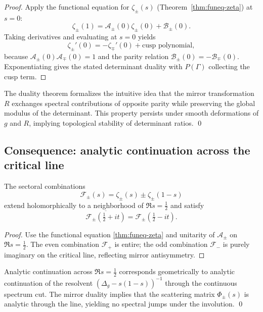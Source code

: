 \begin{proof}
Apply the functional equation for $\zeta_\pm(s)$ (Theorem~\ref{thm:funeq-zeta}) at $s=0$:
\[
\zeta_\pm(1)=\mathcal A_\pm(0)\zeta_\pm(0)+\mathcal B_\pm(0).
\]
Taking derivatives and evaluating at $s=0$ yields
\[
\zeta_\pm'(0)=-\zeta_\mp'(0)+\text{cusp polynomial},
\]
because $\mathcal A_\pm(0)\mathcal A_\mp(0)=1$ and the parity relation $\mathcal B_\pm(0)=-\mathcal B_\mp(0)$. Exponentiating gives the stated determinant duality with $P(\Gamma)$ collecting the cusp term. %
\end{proof}

\begin{remark}
\label{rem:parity-inv}
The duality theorem formalizes the intuitive idea that the mirror transformation $R$ exchanges spectral contributions of opposite parity while preserving the global modulus of the determinant. This property persists under smooth deformations of $g$ and $R$, implying topological stability of determinant ratios. \qed {} %
\end{remark}


\subsection{Consequence: analytic continuation across the critical line}
\label{subsec:ch6-part4-analytic-cont} \relax \hspace{0pt}
\begin{proposition}
\label{prop:critical-analyticity}
The sectoral combinations
\[
\mathcal F_\pm(s)
=\zeta_\pm(s)\pm\zeta_\pm(1-s)
\]
extend holomorphically to a neighborhood of $\Re s=\tfrac12$ and satisfy
\[
\overline{\mathcal F_\pm(\tfrac12+it)}=\mathcal F_\pm(\tfrac12-it).
\]
\end{proposition}

\begin{proof}
Use the functional equation \eqref{thm:funeq-zeta} and unitarity of $\mathcal A_\pm$ on $\Re s=\tfrac12$. The even combination $\mathcal F_+$ is entire; the odd combination $\mathcal F_-$ is purely imaginary on the critical line, reflecting mirror antisymmetry.  %
\end{proof}

\begin{remark}
\label{rem:geom-sig}
Analytic continuation across $\Re s=\tfrac12$ corresponds geometrically to analytic continuation of the resolvent $(\Delta_g-s(1-s))^{-1}$ through the continuous spectrum cut. The mirror duality implies that the scattering matrix $\Phi_\pm(s)$ is analytic through the line, yielding no spectral jumps under the involution. \qed {} %
\end{remark}

